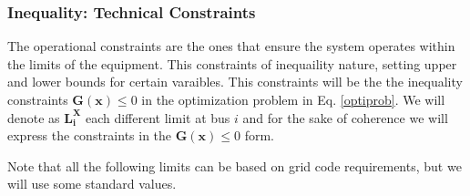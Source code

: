 \documentclass[a4paper,11pt, titlepage, twoside]{article}
\begin{document}




\subsubsection{Inequality: Technical Constraints}\label{inequality}

The operational constraints are the ones that ensure the system operates within the limits of the equipment. This constraints of inequaility nature, setting 
upper and lower bounds for certain varaibles. This constraints will be the the inequality constraints $\mathbf{G(x)} \leq 0$ in the optimization problem in  Eq. \ref{optiprob}. We will
denote as $\mathbf{L_i^X}$ each different limit at bus $i$ and for the sake of coherence we will express the constraints in the $\mathbf{G(x)} \leq 0$ form.\par
Note that all the following limits can be based on grid code requirements, but we will use some standard values.
\end{document}
